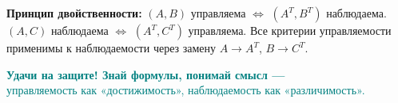 \documentclass[12pt,a4paper]{article}
\begin{document}
	\bigskip
	\begin{infobox}
		\textbf{Принцип двойственности:}
		$(A,B)$ управляема $\Longleftrightarrow$ $(A^T,B^T)$ наблюдаема.
		$(A,C)$ наблюдаема $\Longleftrightarrow$ $(A^T,C^T)$ управляема.
		Все критерии управляемости применимы к наблюдаемости через замену $A\to A^T$, $B\to C^T$.
	\end{infobox}
	
	\vfill
	\begin{center}
		\textcolor{teal}{\textbf{Удачи на защите! Знай формулы, понимай смысл ---}}\\
		\textcolor{teal}{управляемость как «достижимость», наблюдаемость как «различимость».}
	\end{center}
	
\end{document}
